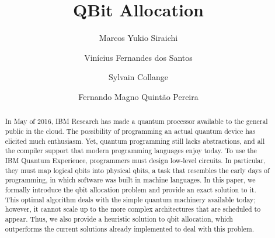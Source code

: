 \documentclass[sigplan,10pt,review,anonymous]{acmart}\settopmatter{printfolios=true}
\begin{document}
\title{QBit Allocation}

\author{Marcos Yukio Siraichi}

\author{Vin\'{i}cius Fernandes dos Santos}

\author{Sylvain Collange}

\author{Fernando Magno Quint\~{a}o Pereira}



\begin{abstract}
In May of 2016, IBM Research has made a quantum processor available to the
general public in the cloud.
The possibility of programming an actual quantum device has elicited much
enthusiasm.
Yet, quantum programming still lacks abstractions, and all the compiler
support that modern programming languages enjoy today.
To use the IBM Quantum Experience, programmers must design low-level circuits.
In particular, they must map logical qbits into physical qbits, a task that
resembles the early days of programming, in which software was built in
machine languages.
In this paper, we formally introduce the qbit allocation problem and provide an
exact solution to it.
This optimal algorithm deals with the simple quantum machinery available
today; however, it cannot scale up to the more complex architectures that are
scheduled to appear.
Thus, we also provide a heuristic solution to qbit allocation, which outperforms
the current solutions already implemented to deal with this problem.
\end{abstract}
\end{document}

